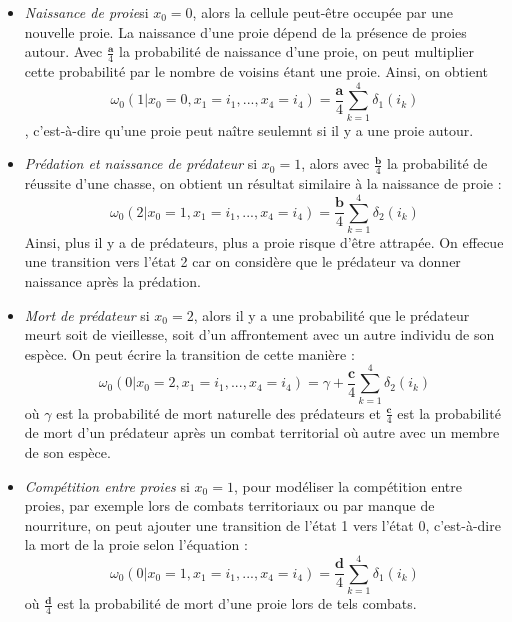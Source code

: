 \begin {itemize}
\item \textit{Naissance de proie}si $x_0=0$, alors la cellule peut-être occupée par une nouvelle proie. La naissance d'une proie dépend de la présence de proies autour. Avec $\frac{\textbf{a}}{4}$ la probabilité de naissance d'une proie, on peut multiplier cette probabilité par le nombre de voisins étant une proie. Ainsi, on obtient \begin{equation}\omega_0(1|x_0=0, x_1=i_1, ..., x_4=i_4)=\frac{\textbf{a}}{4}\sum_{k=1}^{4}\delta_{1}(i_k)\end{equation}, c'est-à-dire qu'une proie peut naître seulemnt si il y a une proie autour.


\item \textit{Prédation et naissance de prédateur} si $x_0=1$, alors avec $\frac{\textbf{b}}{4}$ la probabilité de réussite d'une chasse, on obtient un résultat similaire à la naissance de proie :\begin{equation} \omega_0(2|x_0=1, x_1=i_1, ..., x_4=i_4)=\frac{\textbf{b}}{4}\sum_{k=1}^{4}\delta_{2}(i_k)\end{equation} Ainsi, plus il y a de prédateurs, plus a proie risque d'être attrapée. On effecue une transition vers l'état 2 car on considère que le prédateur va donner naissance après la prédation.


\item \textit{Mort de prédateur}  si $x_0=2$, alors il y a une probabilité que le prédateur meurt soit de vieillesse, soit d'un affrontement avec un autre individu de son espèce. On peut écrire la transition de cette manière : \begin{equation}\omega_0(0|x_0=2, x_1=i_1, ..., x_4=i_4)=\gamma + \frac{\textbf{c}}{4}\sum_{k=1}^{4}\delta_{2}(i_k)\end{equation} où $\gamma$ est la probabilité de mort naturelle des prédateurs et $\frac{\textbf{c}}{4}$ est la probabilité de mort d'un prédateur après un combat territorial où autre avec un membre de son espèce. 


\item \textit{Compétition entre proies}  si $x_0=1$, pour modéliser la compétition entre proies, par exemple lors de combats territoriaux ou par manque de nourriture, on peut ajouter une transition de l'état 1 vers l'état 0, c'est-à-dire la mort de la proie selon l'équation : \begin{equation}\omega_0(0|x_0=1, x_1=i_1, ..., x_4=i_4)=\frac{\textbf{d}}{4}\sum_{k=1}^{4}\delta_{1}(i_k)\end{equation} où $\frac{\textbf{d}}{4}$ est la probabilité de mort d'une proie lors de tels combats.

\end{itemize}

